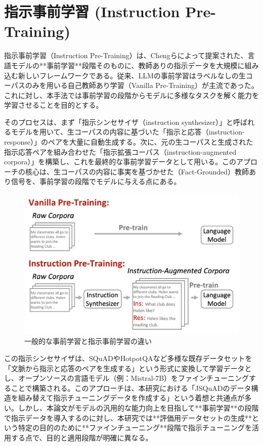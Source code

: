 \documentclass[a4paper,11pt]{jreport}
\begin{document}
\section{指示事前学習 (Instruction Pre-Training)}
\label{sec:instruction_pre-training}

指示事前学習（Instruction Pre-Training）は、Chengらによって提案された\cite{Instruction Pre-Training}、言語モデルの**事前学習**段階そのものに、教師ありの指示データを大規模に組み込む新しいフレームワークである。従来、LLMの事前学習はラベルなしの生コーパスのみを用いる自己教師あり学習（Vanilla Pre-Training）が主流であった。これに対し、本手法では事前学習の段階からモデルに多様なタスクを解く能力を学習させることを目的とする。

そのプロセスは、まず「指示シンセサイザ（instruction synthesizer）」と呼ばれるモデルを用いて、生コーパスの内容に基づいた「指示と応答（instruction-response）」のペアを大量に自動生成する。次に、元の生コーパスと生成された指示応答ペアを組み合わせた「指示拡張コーパス（instruction-augmented corpora）」を構築し、これを最終的な事前学習データとして用いる。このアプローチの核心は、生コーパスの内容に事実を基づかせた（Fact-Grounded）教師あり信号を、事前学習の段階でモデルに与える点にある。

\begin{figure}[t]
  \centering
  \includegraphics[width=\linewidth]{./fig/instruction-pretraining_fig1.png}
  \caption{一般的な事前学習と指示事前学習の違い\cite{Instruction Pre-Training}}
  \label{fig:instruction_pretraining_example}
\end{figure}

この指示シンセサイザは、SQuADやHotpotQAなど多様な既存データセットを「文脈から指示と応答のペアを生成する」という形式に変換して学習データとし、オープンソースの言語モデル（例：Mistral-7B）をファインチューニングすることで構築される\cite{Instruction Pre-Training}。このアプローチは、本研究における「JSQuADのデータ構造を組み替えて指示チューニングデータを作成する」という着想と共通点が多い。しかし、本論文がモデルの汎用的な能力向上を目指して**事前学習**の段階で指示データを導入するのに対し、本研究では**評価用データセットの生成**という特定の目的のために**ファインチューニング**段階で指示チューニングを活用する点で、目的と適用段階が明確に異なる。
\end{document}
